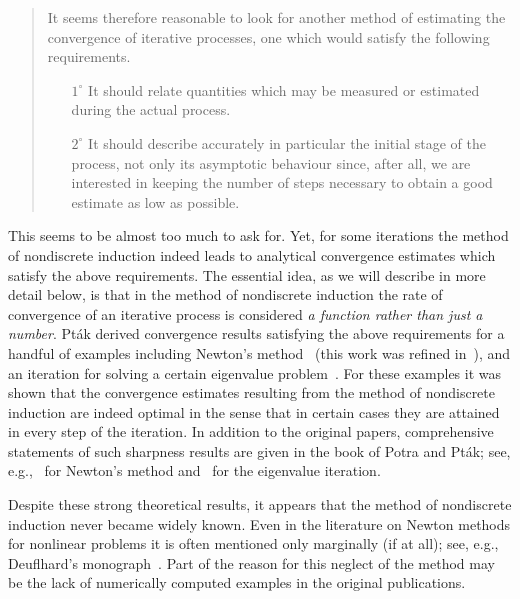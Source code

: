 \documentclass{siamltex}
\begin{document}
\medskip
\begin{quote}
It seems therefore reasonable to look for another method of estimating the
convergence of iterative processes, one which would satisfy the following
requirements.
\begin{itemize}
\item[$1^\circ$] It should relate quantities which may be measured or estimated
during the actual process.
\item[$2^\circ$] It should describe accurately in particular the initial stage
of the process, not only its asymptotic behaviour since, after all, we
are interested in keeping the number of steps necessary to obtain a good
estimate as low as possible.
\end{itemize}
\end{quote}

\medskip
This seems to be almost too much to ask for. Yet, for some iterations the
method of nondiscrete induction indeed leads to analytical convergence
estimates which satisfy the above requirements. The essential idea, as we will
describe in more detail below, is that in the method of nondiscrete induction
the rate of convergence of an iterative process is considered {\em a function rather
than just a number}. Pt\'ak derived convergence results satisfying the above
requirements for a handful of examples including Newton's method~\cite{Pta76a}
(this work was refined in~\cite{PotPta80}), and an iteration for solving a certain
eigenvalue problem~\cite{Pta76b}.
For these examples it was shown that the convergence estimates
resulting from the method of nondiscrete induction are indeed
optimal in the sense that in certain cases they are attained
in every step of the iteration. In addition to
the original papers, comprehensive statements of such sharpness results are
given in the book of Potra and Pt\'ak; see,
e.g.,~\cite[Proposition~5.10]{PotPtaBook84} for Newton's method
and~\cite[Proposition~7.5]{PotPtaBook84} for the eigenvalue iteration.

Despite these strong theoretical results, it appears that the method of nondiscrete induction
never became widely known. Even in the literature on Newton methods for nonlinear
problems it is often mentioned only marginally (if at all); see, e.g., Deuflhard's
monograph~\cite[p.~49]{DeuBook11}. Part of the reason for this neglect of the
method may be the lack of numerically computed examples in the original publications.
\end{document}
